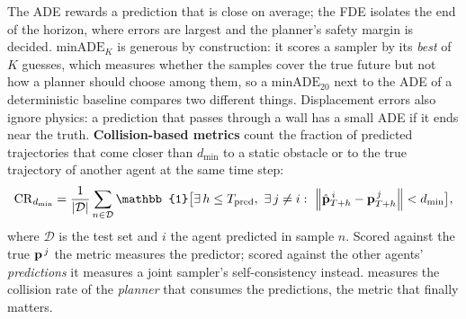The ADE rewards a prediction that is close on average; the FDE isolates the
end of the horizon, where errors are largest and the planner's safety margin
is decided. $\mathrm{minADE}_K$ is generous by construction: it scores a
sampler by its \emph{best} of $K$ guesses, which measures whether the samples
cover the true future but not how a planner should choose among them, so a
$\mathrm{minADE}_{20}$ next to the ADE of a deterministic baseline compares
two different things. Displacement errors also ignore physics: a prediction
that passes through a wall has a small ADE if it ends near the truth.
\textbf{Collision-based metrics} count
the fraction of predicted trajectories that come closer than $d_{\min}$ to a
static obstacle or to the true trajectory of another agent at the same time
step:
\begin{equation}
  \mathrm{CR}_{d_{\min}} = \frac{1}{\abs{\mathcal{D}}} \sum_{n \in \mathcal{D}}
  \mathbb{1}\bigl[\exists\, h \le T_{\mathrm{pred}},\ \exists\, j \ne i :\
  \norm{\hat{\pos}^{\,i}_{T+h} - \pos^{\,j}_{T+h}} < d_{\min}\bigr],
  \label{eq:ch20-collision-rate}
\end{equation}
where $\mathcal{D}$ is the test set and $i$ the agent predicted in sample
$n$. Scored against the true $\mathbf{p}^{\,j}$ the metric measures the predictor;
scored against the other agents' \emph{predictions} it measures a joint
sampler's self-consistency instead. \Cref{ch:ch25} measures the collision
rate of the \emph{planner} that consumes the predictions, the metric that
finally matters.

